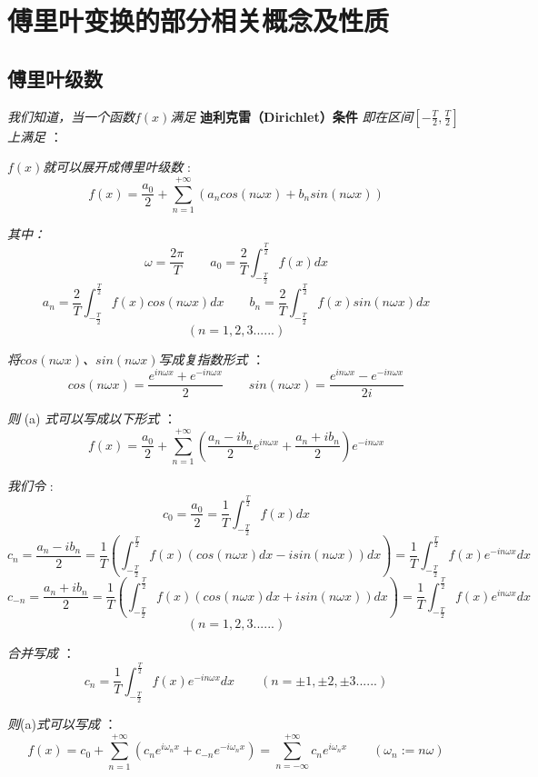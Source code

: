 \section{傅里叶变换的部分相关概念及性质}

\subsection{傅里叶级数}

\textit{我们知道，当一个函数$f(x)$满足} \textbf{迪利克雷（Dirichlet）条件} \textit{即在区间${[-\frac{T}{2},\frac{T}{2}]}$上满足} ：

\qquad \qquad {}

\qquad \qquad {}

\textit{$f(x)$就可以展开成傅里叶级数} :
\[f(x)=\frac{a_0}{2}+\sum_{n=1}^{+\infty}(a_ncos(n\omega x)+b_nsin(n\omega x)) \tag{a}\]

\textit{其中：}
\[\omega=\frac{2\pi}{T} \qquad a_0=\frac{2}{T}\int_{-\frac{T}{2}}^{\frac{T}{2}}f(x)dx\]
\[a_n=\frac{2}{T}\int_{-\frac{T}{2}}^{\frac{T}{2}}f(x)cos(n\omega x)dx \qquad b_n=\frac{2}{T}\int_{-\frac{T}{2}}^{\frac{T}{2}}f(x)sin(n\omega x)dx\]
\[(n=1,2,3......) \tag{b}\]

\textit{将$cos(n\omega x)$、$sin(n\omega x)$写成复指数形式} ：
\[cos(n\omega x)=\frac{e^{in\omega x}+e^{-in\omega x}}{2} \qquad sin(n\omega x)=\frac{e^{in\omega x}-e^{-in\omega x}}{2i} \tag{c}\]

\textit{则} (a) \textit{式可以写成以下形式 }：
\[f(x)=\frac{a_0}{2}+\sum_{n=1}^{+\infty}(\frac{a_n-ib_n}{2}e^{in\omega x}+\frac{a_n+ib_n}{2})e^{-in\omega x} \tag{d}\]

\textit{我们令 }:
\[c_0=\frac{a_0}{2}=\frac{1}{T}\int_{-\frac{T}{2}}^{\frac{T}{2}}f(x)dx\]
\[c_n=\frac{a_n-ib_n}{2}=\frac{1}{T}(\int_{-\frac{T}{2}}^{\frac{T}{2}}f(x)(cos(n\omega x)dx-isin(n\omega x))dx)=\frac{1}{T}\int_{-\frac{T}{2}}^{\frac{T}{2}}f(x)e^{-in\omega x}dx\]
\[c_{-n}=\frac{a_n+ib_n}{2}=\frac{1}{T}(\int_{-\frac{T}{2}}^{\frac{T}{2}}f(x)(cos(n\omega x)dx+isin(n\omega x))dx)=\frac{1}{T}\int_{-\frac{T}{2}}^{\frac{T}{2}}f(x)e^{in\omega x}dx\]
\[(n=1,2,3......)\]

\textit{合并写成 }：
\[c_n=\frac{1}{T}\int_{-\frac{T}{2}}^{\frac{T}{2}}f(x)e^{-in\omega x}dx \qquad (n=\pm 1,\pm 2,\pm 3......) \tag{e}\]

\textit{则}(a)\textit{式可以写成 }：
\[f(x)=c_0+\sum_{n=1}^{+\infty}(c_ne^{i\omega_n x}+c_{-n}e^{-i\omega_n x})=\sum_{n=-\infty}^{+\infty}c_ne^{i\omega_n x} \qquad (\omega_n:=n\omega) \tag{f}\]

